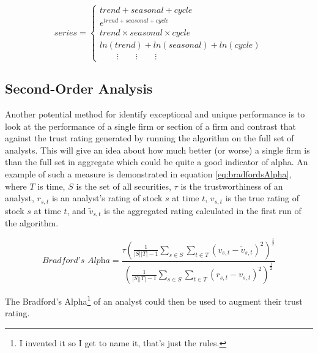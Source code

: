 \begin{equation}
    \textit{series} = \begin{cases}
    \textit{trend} + \textit{seasonal} + \textit{cycle} \\
    e^{\textit{trend} + \textit{seasonal} + \textit{cycle}} \\
    \textit{trend}\times \textit{seasonal}\times \textit{cycle} \\
    ln(\textit{trend}) + ln(\textit{seasonal}) + ln(\textit{cycle})\\
    \qquad\vdots\qquad\vdots\qquad\vdots
    \end{cases} \label{eq:decomp}
\end{equation}

\subsection{Second-Order Analysis}
Another potential method for identify exceptional and unique performance is to look at the performance of a single firm or section of a firm and contrast that against the trust rating generated by running the algorithm on the full set of analysts. This will give an idea about how much better (or worse) a single firm is than the full set in aggregate which could be quite a good indicator of alpha. An example of such a measure is demonstrated in equation \ref{eq:bradfordsAlpha}, where $T$ is time, $S$ is the set of all securities, $\tau$ is the trustworthiness of an analyst, $r_{s,t}$ is an analyst's rating of stock $s$ at time $t$, $v_{s,t}$ is the true rating of stock $s$ at time $t$, and $\tilde{v}_{s,t}$ is the aggregated rating calculated in the first run of the algorithm. 

\begin{equation}
    \textit{Bradford's Alpha} = \frac{\tau \left(\frac{1}{|S||T| - 1}\sum\limits_{s\in S}\sum\limits_{t\in T}(v_{s,t} - \tilde{v}_{s,t}) ^2\right)^\frac{1}{2}}{\left(\frac{1}{|S||T| - 1}\sum\limits_{s\in S}\sum\limits_{t\in T}(r_{s,t} - v_{s,t} )^2\right)^\frac{1}{2}} \label{eq:bradfordsAlpha}
\end{equation}

The Bradford's Alpha\footnote{I invented it so I get to name it, that's just the rules.} of an analyst could then be used to augment their trust rating.






